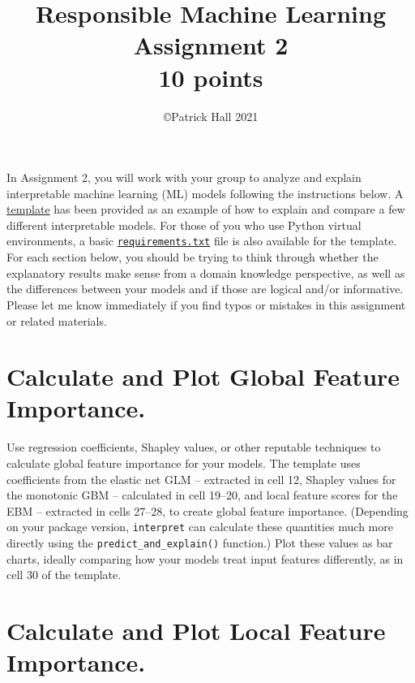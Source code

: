 \documentclass[fleqn]{article}
\title{Responsible Machine Learning\\\Large{Assignment 2}\\\Large{10 points}}
\author{\copyright Patrick Hall 2021}
\begin{document}
\maketitle

\noindent In Assignment 2, you will work with your group to analyze and explain interpretable machine learning (ML) models following the instructions below. A \href{https://nbviewer.jupyter.org/github/jphall663/GWU_rml/blob/master/assignments/assignment_2/assign_2_template.ipynb?flush_cache=true}{template} has been provided as an example of how to explain and compare a few different interpretable models. For those of you who use Python virtual environments, a basic \href{https://github.com/jphall663/GWU_rml/blob/master/assignments/requirements.txt}{\texttt{requirements.txt}} file is also available for the template.\\

\noindent For each section below, you should be trying to think through whether the explanatory results make sense from a domain knowledge perspective, as well as the differences between your models and if those are logical and/or informative.\\

\noindent Please let me know immediately if you find typos or mistakes in this assignment or related materials. 

\section{Calculate and Plot Global Feature Importance.}\label{global_fi}

Use regression coefficients, Shapley values, or other reputable techniques to calculate global feature importance for your models. The template uses coefficients from the elastic net GLM -- extracted in cell 12, Shapley values for the monotonic GBM -- calculated in cell 19--20, and local feature scores for the EBM -- extracted in cells 27--28, to create global feature importance. (Depending on your package version, \texttt{interpret} can calculate these quantities much more directly using the \texttt{predict\_and\_explain()} function.) Plot these values as bar charts, ideally comparing how your models treat input features differently, as in cell 30 of the template.\\

\section{Calculate and Plot Local Feature Importance.}
\end{document}

